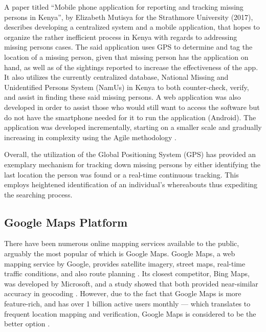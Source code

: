 A paper titled “Mobile phone application for reporting and tracking missing persons in Kenya”, by Elizabeth Mutisya for the Strathmore University (2017), describes developing a centralized system and a mobile application, that hopes to organize the rather inefficient process in Kenya with regards to addressing missing persons cases. The said application uses GPS to determine and tag the location of a missing person, given that missing person has the application on hand, as well as of the sightings reported to increase the effectiveness of the app. It also utilizes the currently centralized database, National Missing and Unidentified Persons System (NamUs) in Kenya to both counter-check, verify, and assist in finding these said missing persons. A web application was also developed in order to assist those who would still want to access the software but do not have the smartphone needed for it to run the application (Android). The application was developed incrementally, starting on a smaller scale and gradually increasing in complexity using the Agile methodology \cite{mutisya2017mobile}.


Overall, the utilization of the Global Positioning System (GPS) has provided an exemplary mechanism for tracking down missing persons by either identifying the last location the person was found or a real-time continuous tracking. This employs heightened identification of an individual’s whereabouts thus expediting the searching process.

\subsection{Google Maps Platform}

There have been numerous online mapping services available to the public, arguably the most popular of which is Google Maps. Google Maps, a web mapping service by Google, provides satellite imagery, street maps, real-time traffic conditions, and also route planning \cite{antony_2021}. Its closest competitor, Bing Maps, was developed by Microsoft, and a study showed that both provided near-similar accuracy in geocoding \cite{kilic2020accuracy}. However, due to the fact that Google Maps is more feature-rich, and has over 1 billion active users monthly — which translates to frequent location mapping and verification, Google Maps is considered to be the better option \cite{lookingbill2019google}.

